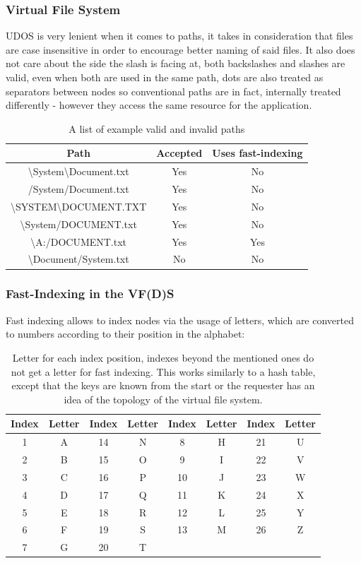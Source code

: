 \documentclass{article}
\begin{document}
\subsubsection{Virtual File System}
UDOS is very lenient when it comes to paths, it takes in consideration that files are case insensitive in order to encourage better naming of said files.
It also does not care about the side the slash is facing at, both backslashes and slashes are valid, even when both are used in the same path, dots are also treated as separators between nodes so conventional paths are in fact, internally treated differently - however they access the same resource for the application.

\begin{table}
\begin{tabular}{ |c|c|c| }
	\hline
	Path & Accepted & Uses fast-indexing \\
	\hline
	\textbackslash{System}\textbackslash{Document.txt} & Yes & No \\
	/System/Document.txt & Yes & No \\
	\textbackslash{SYSTEM}\textbackslash{DOCUMENT.TXT} & Yes & No \\
	\textbackslash{System/DOCUMENT.txt} & Yes & No \\
	\textbackslash{A:/DOCUMENT.txt} & Yes & Yes \\
	\textbackslash{Document/System.txt} & No & No \\
	\hline
\end{tabular}
\caption{A list of example valid and invalid paths}
\end{table}

\subsubsection{Fast-Indexing in the VF(D)S}
Fast indexing allows to index nodes via the usage of letters, which are
converted to numbers according to their position in the alphabet:

\begin{table}
\begin{tabular}{ |c|c|c|c|c|c|c|c| }
	\hline
	Index & Letter & Index & Letter & Index & Letter & Index & Letter \\
	\hline
	1 & A & 14 & N & 8 & H & 21 & U \\
	2 & B & 15 & O & 9 & I & 22 & V \\
	3 & C & 16 & P & 10 & J & 23 & W \\
	4 & D & 17 & Q & 11 & K & 24 & X \\
	5 & E & 18 & R & 12 & L & 25 & Y \\
	6 & F & 19 & S & 13 & M & 26 & Z \\
	7 & G & 20 & T &    &   &    & \\
	\hline
\end{tabular}
\caption{Letter for each index position, indexes beyond the mentioned ones do not get a letter for fast indexing. This works similarly to a hash table, except that the keys are known from the start or the requester has an idea of the topology of the virtual file system.}
\end{table}
\end{document}
